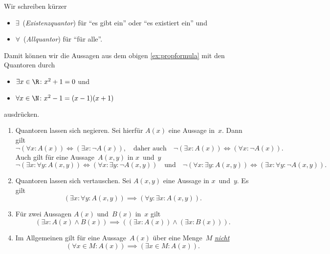 \documentclass[a4paper]{article}
\begin{document}
\begin{notation}[Quantoren]
    Wir schreiben kürzer
    \begin{itemize}
        \item $\exists$~(\emph{Existenzquantor}) für "`es gibt ein"' oder "`es existiert ein"' und
        \item $\forall$~(\emph{Allquantor}) für "`für alle"'.
    \end{itemize}
\end{notation}

Damit können wir die Aussagen aus dem obigen \cref{ex:propformula} mit den Quantoren durch
\begin{itemize}
    \item $\exists x \in \R\colon x^2 + 1 = 0$ und
    \item $\forall x \in \N\colon x^2 - 1 = (x - 1) (x + 1)$
\end{itemize}
ausdrücken.

\begin{theorem}\leavevmode
    \begin{enumerate}
        \item Quantoren lassen sich negieren. Sei hierfür $A(x)$ eine Aussage in~$x$. Dann gilt
              \begin{equation*}
                  \neg (\forall x\colon A(x)) \iff (\exists x\colon \neg A(x)), \quad\text{daher auch}\quad \neg (\exists x\colon A(x)) \iff (\forall x\colon \neg A(x)).
              \end{equation*}
              Auch gilt für eine Aussage~$A(x, y)$ in $x$~und~$y$
              \begin{equation*}
                  \neg (\exists x\colon \forall y\colon A(x, y)) \iff (\forall x\colon \exists y\colon \neg A(x, y)) \quad\text{und}\quad \neg (\forall x\colon \exists y\colon A(x, y)) \iff (\exists x\colon \forall y\colon \neg A(x, y)).
              \end{equation*}
        \item Quantoren lassen sich vertauschen. Sei $A(x, y)$ eine Aussage in $x$~und~$y$. Es gilt
              \begin{equation*}
                  (\exists x\colon \forall y\colon A(x, y)) \implies (\forall y\colon \exists x\colon A(x, y)).
              \end{equation*}
        \item Für zwei Aussagen $A(x)$ und~$B(x)$ in~$x$ gilt
              \begin{equation*}
                  (\exists x\colon A(x) \wedge B(x)) \implies ((\exists x\colon A(x)) \wedge (\exists x\colon B(x))).
              \end{equation*}
        \item Im Allgemeinen gilt für eine Aussage~$A(x)$ über eine Menge~$M$ \underline{\emph{nicht}}
              \begin{equation*}
                  (\forall x \in M\colon A(x)) \implies (\exists x \in M\colon A(x)).
              \end{equation*}
    \end{enumerate}
\end{theorem}
\end{document}
